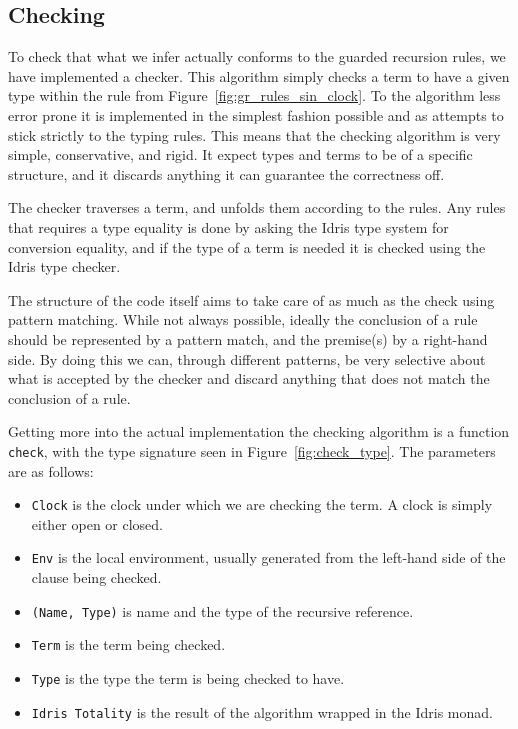 \subsection{Checking}
To check that what we infer actually conforms to the guarded recursion rules, we
have implemented a checker. This algorithm simply checks a term to have a given
type within the rule from Figure~\ref{fig:gr_rules_sin_clock}. To the algorithm
less error prone it is implemented in the simplest fashion possible and as
attempts to stick strictly to the typing rules. This means that the checking
algorithm is very simple, conservative, and rigid. It expect types and terms to
be of a specific structure, and it discards anything it can guarantee the
correctness off. 

The checker traverses a term, and unfolds them according to the rules. Any rules
that requires a type equality is done by asking the Idris type system for
conversion equality, and if the type of a term is needed it is checked using the
Idris type checker.

The structure of the code itself aims to take care of as much as the check using
pattern matching. While not always possible, ideally the conclusion of a rule
should be represented by a pattern match, and the premise(s) by a right-hand
side. By doing this we can, through different patterns, be very selective about
what is accepted by the checker and discard anything that does not match the
conclusion of a rule.

Getting more into the actual implementation the checking algorithm is a function
\texttt{check}, with the type signature seen in Figure~\ref{fig:check_type}. The
parameters are as follows:

\begin{itemize}
\item \texttt{Clock} is the clock under which we are checking the term. A clock
  is simply either open or closed.
\item \texttt{Env} is the local environment, usually generated from the
  left-hand side of the clause being checked.
\item \texttt{(Name, Type)} is name and the type of the recursive
  reference. 
\item \texttt{Term} is the term being checked.
\item \texttt{Type} is the type the term is being checked to have.
\item \texttt{Idris Totality} is the result of the algorithm wrapped in the
  Idris monad. 
\end{itemize}

